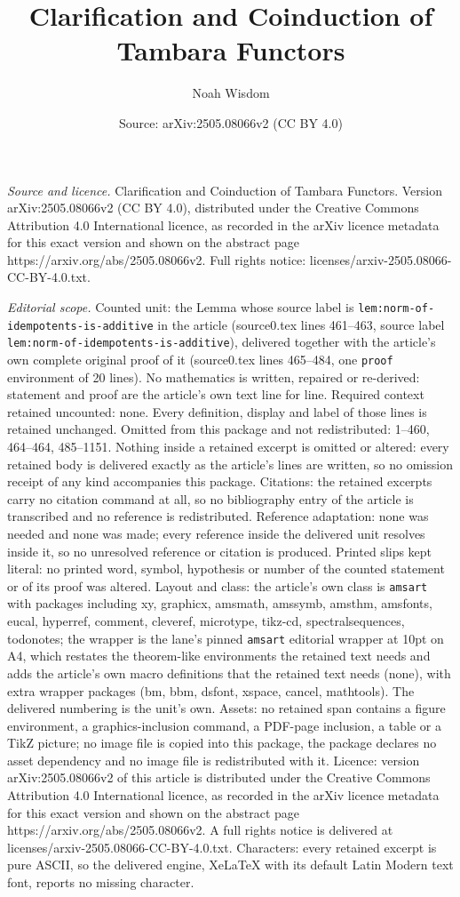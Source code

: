 \documentclass[10pt,a4paper]{amsart}
\title[Clarification and Coinduction of Tambara Functors]{Clarification and Coinduction of Tambara Functors}
\author{Noah Wisdom}
\date{Source: arXiv:2505.08066v2 (CC BY 4.0)}
\begin{document}
\maketitle

\noindent\emph{Source and licence.} Clarification and Coinduction of Tambara Functors. Version arXiv:2505.08066v2 (CC BY 4.0), distributed under the Creative Commons Attribution 4.0 International licence, as recorded in the arXiv licence metadata for this exact version and shown on the abstract page https://arxiv.org/abs/2505.08066v2. Full rights notice: licenses/arxiv-2505.08066-CC-BY-4.0.txt.\par\smallskip

\noindent\textit{Editorial scope.} Counted unit: the Lemma whose source label is \texttt{lem:norm-of-idempotents-is-additive} in the article (source0.tex lines 461--463, source label \texttt{lem:norm-of-idempotents-is-additive}), delivered together with the article's own complete original proof of it (source0.tex lines 465--484, one \texttt{proof} environment of 20 lines). No mathematics is written, repaired or re-derived: statement and proof are the article's own text line for line. Required context retained uncounted: none. Every definition, display and label of those lines is retained unchanged. Omitted from this package and not redistributed: 1--460, 464--464, 485--1151. Nothing inside a retained excerpt is omitted or altered: every retained body is delivered exactly as the article's lines are written, so no omission receipt of any kind accompanies this package. Citations: the retained excerpts carry no citation command at all, so no bibliography entry of the article is transcribed and no reference is redistributed. Reference adaptation: none was needed and none was made; every reference inside the delivered unit resolves inside it, so no unresolved reference or citation is produced. Printed slips kept literal: no printed word, symbol, hypothesis or number of the counted statement or of its proof was altered. Layout and class: the article's own class is \texttt{amsart} with packages including xy, graphicx, amsmath, amssymb, amsthm, amsfonts, eucal, hyperref, comment, cleveref, microtype, tikz-cd, spectralsequences, todonotes; the wrapper is the lane's pinned \texttt{amsart} editorial wrapper at 10pt on A4, which restates the theorem-like environments the retained text needs and adds the article's own macro definitions that the retained text needs (none), with extra wrapper packages (bm, bbm, dsfont, xspace, cancel, mathtools). The delivered numbering is the unit's own. Assets: no retained span contains a figure environment, a graphics-inclusion command, a PDF-page inclusion, a table or a TikZ picture; no image file is copied into this package, the package declares no asset dependency and no image file is redistributed with it. Licence: version arXiv:2505.08066v2 of this article is distributed under the Creative Commons Attribution 4.0 International licence, as recorded in the arXiv licence metadata for this exact version and shown on the abstract page https://arxiv.org/abs/2505.08066v2. A full rights notice is delivered at licenses/arxiv-2505.08066-CC-BY-4.0.txt. Characters: every retained excerpt is pure ASCII, so the delivered engine, XeLaTeX with its default Latin Modern text font, reports no missing character.
\end{document}
